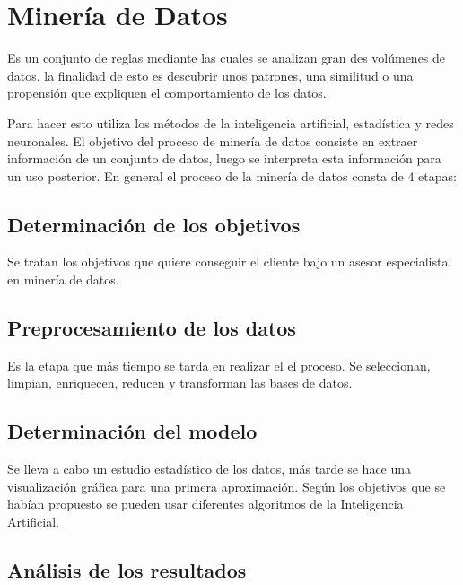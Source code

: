 

\section{Minería de Datos}\label{mineria-de-datos}

Es un conjunto de reglas mediante las cuales se analizan gran des volúmenes de datos, la finalidad de esto es descubrir unos patrones, una similitud o una propensión que expliquen el comportamiento de los datos.

Para hacer esto utiliza los métodos de la inteligencia artificial, estadística y redes neuronales.
El objetivo del proceso de minería de datos consiste en extraer información de un conjunto de datos, luego se interpreta esta información para un uso posterior.
En general el proceso de la minería de datos consta de 4 etapas:

\subsection{Determinación de los objetivos}\label{determinación-de-los-objetivos}

Se tratan los objetivos que quiere conseguir el cliente bajo un asesor especialista en minería de datos.

\subsection{Preprocesamiento de los datos}\label{preprocesamiento-de-los-datos}	
	
Es la etapa que más tiempo se tarda en realizar el el proceso. Se seleccionan, limpian, enriquecen, reducen y transforman las bases de datos.

\subsection{Determinación del modelo}\label{determinación-del-modelo}	

Se lleva a cabo un estudio estadístico de los datos, más tarde se hace una visualización gráfica para una primera aproximación. Según los objetivos que se habían propuesto se pueden usar diferentes algoritmos de la Inteligencia Artificial.

\subsection{Análisis de los resultados}\label{análisis-de-los-resultados}	

